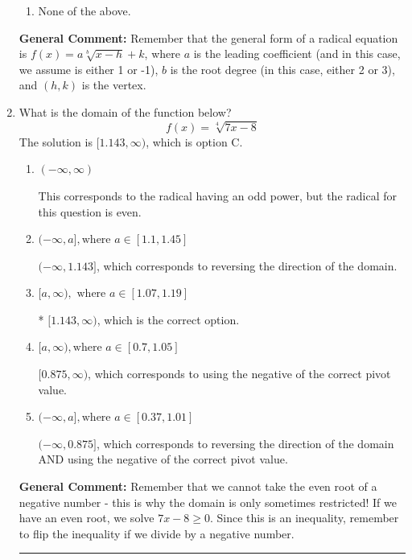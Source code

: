 \documentclass{extbook}[14pt]
\newcommand{\litem}[1]{\item #1

\rule{\textwidth}{0.4pt}}
\begin{document}
\begin{enumerate}
{\begin{enumerate}[label=\Alph*.]
\item None of the above.\end{enumerate}
\textbf{General Comment:} Remember that the general form of a radical equation is $ f(x) = a \sqrt[b]{x - h} + k $, where $a$ is the leading coefficient (and in this case, we assume is either 1 or -1), $b$ is the root degree (in this case, either 2 or 3), and $(h, k)$ is the vertex.
}
\litem{
What is the domain of the function below?
\[ f(x) = \sqrt[4]{7 x - 8} \]The solution is \( [1.143, \infty) \), which is option C.\begin{enumerate}[label=\Alph*.]
\item \( (-\infty, \infty) \)

This corresponds to the radical having an odd power, but the radical for this question is even.
\item \( (-\infty, a], \text{where } a \in [1.1, 1.45] \)

 $(-\infty, 1.143]$, which corresponds to reversing the direction of the domain.
\item \( [a, \infty), \text{ where } a \in [1.07, 1.19] \)

* $[1.143, \infty)$, which is the correct option.
\item \( [a, \infty), \text{where } a \in [0.7, 1.05] \)

$[0.875, \infty)$, which corresponds to using the negative of the correct pivot value.
\item \( (-\infty, a], \text{where } a \in [0.37, 1.01] \)

$(-\infty, 0.875]$, which corresponds to reversing the direction of the domain AND using the negative of the correct pivot value.
\end{enumerate}

\textbf{General Comment:} Remember that we cannot take the even root of a negative number - this is why the domain is only sometimes restricted! If we have an even root, we solve $7 x - 8 \geq 0$. Since this is an inequality, remember to flip the inequality if we divide by a negative number.
}
\end{enumerate}
\end{document}
